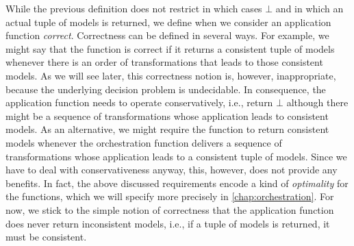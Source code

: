 While the previous definition does not restrict in which cases $\bot$ and in which an actual tuple of models is returned, we define when we consider an application function \emph{correct}.
Correctness can be defined in several ways.
For example, we might say that the function is correct if it returns a consistent tuple of models whenever there is an order of transformations that leads to those consistent models.
As we will see later, this correctness notion is, however, inappropriate, because the underlying decision problem is undecidable.
In consequence, the application function needs to operate conservatively, i.e., return $\bot$ although there might be a sequence of transformations whose application leads to consistent models.
As an alternative, we might require the function to return consistent models whenever the orchestration function delivers a sequence of transformations whose application leads to a consistent tuple of models.
Since we have to deal with conservativeness anyway, this, however, does not provide any benefits.
In fact, the above discussed requirements encode a kind of \emph{optimality} for the functions, which we will specify more precisely in \autoref{chap:orchestration}.
For now, we stick to the simple notion of correctness that the application function does never return inconsistent models, i.e., if a tuple of models is returned, it must be consistent.

